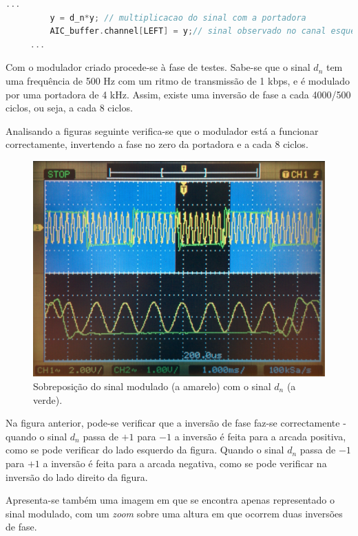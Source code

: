 \documentclass[11pt]{article}
\numberwithin{equation}{section}
\begin{document}
\begin{lstlisting}[language=C]
	 ...
		 y = d_n*y; // multiplicacao do sinal com a portadora
		 AIC_buffer.channel[LEFT] = y;// sinal observado no canal esquerdo
	 ...
\end{lstlisting}

Com o modulador criado procede-se à fase de testes. Sabe-se que o sinal $d_n$ tem uma frequência de 500 Hz com um ritmo de transmissão de 1 kbps, e é modulado por uma portadora de 4 kHz. Assim, existe uma inversão de fase a cada 4000/500 ciclos, ou seja, a cada 8 ciclos.

Analisando a figuras seguinte verifica-se que o modulador está a funcionar correctamente, invertendo a fase no zero da portadora e a cada 8 ciclos.

\begin{figure}[H]
	\centering
	\includegraphics[keepaspectratio=true, scale=0.10]{exps/dn_com_y}
	\caption{Sobreposição do sinal modulado (a amarelo) com o sinal $d_n$ (a verde).}
	\vspace{-0.8em}
\end{figure}

Na figura anterior, pode-se verificar que a inversão de fase faz-se correctamente - quando o sinal $d_n$ passa de $+1$ para $-1$ a inversão é feita para a arcada positiva, como se pode verificar do lado esquerdo da figura. Quando o sinal $d_n$ passa de $-1$ para $+1$ a inversão é feita para a arcada negativa, como se pode verificar na inversão do lado direito da figura.

Apresenta-se também uma imagem em que se encontra apenas representado o sinal modulado, com um \textit{zoom} sobre uma altura em que ocorrem duas inversões de fase. 
\end{document}

